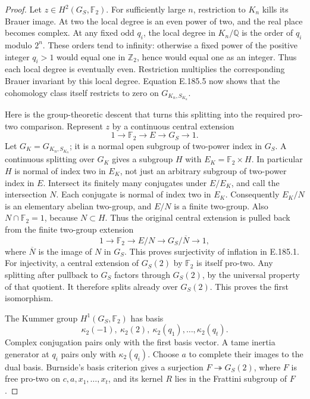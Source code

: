 \begin{proof}
Let \(z\in H^2(G_S,\mathbb F_2)\). For sufficiently large
\(n\), restriction to \(K_n\) kills its Brauer image. At two
the local degree is an even power of two, and the real place
becomes complex. At any fixed odd \(q_i\), the local degree
in \(K_n/\mathbb Q\) is the order of \(q_i\) modulo
\(2^n\). These orders tend to infinity: otherwise a fixed
power of the positive integer \(q_i>1\) would equal one in
\(\mathbb Z_2\), hence would equal one as an integer. Thus
each local degree is eventually even. Restriction multiplies
the corresponding Brauer invariant by this local degree.
Equation E.185.5 now shows that the cohomology class itself
restricts to zero on \(G_{K_n,S_{K_n}}\).

Here is the group-theoretic descent that turns this splitting
into the required pro-two comparison. Represent \(z\) by a
continuous central extension
\[
              1\longrightarrow\mathbb F_2
                \longrightarrow E\longrightarrow G_S
                \longrightarrow1.
\]
Let \(G_K=G_{K_n,S_{K_n}}\); it is a normal open subgroup
of two-power index in \(G_S\). A continuous splitting over
\(G_K\) gives a subgroup \(H\) with
\(E_K=\mathbb F_2\times H\). In particular \(H\) is
normal of index two in \(E_K\), not just an arbitrary
subgroup of two-power index in \(E\). Intersect its finitely
many conjugates under \(E/E_K\), and call the intersection
\(N\). Each conjugate is normal of index two in \(E_K\).
Consequently \(E_K/N\) is an elementary abelian two-group,
and \(E/N\) is a finite two-group. Also
\(N\cap\mathbb F_2=1\), because \(N\subset H\).
Thus the original central extension is pulled back from
the finite two-group extension
\[
       1\longrightarrow\mathbb F_2\longrightarrow E/N
           \longrightarrow G_S/\overline N\longrightarrow1,
\]
where \(\overline N\) is the image of \(N\) in \(G_S\).
This proves surjectivity of inflation in E.185.1.
For injectivity, a central extension of \(G_S(2)\) by
\(\mathbb F_2\) is itself pro-two. Any splitting after
pullback to \(G_S\) factors through \(G_S(2)\), by the
universal property of that quotient. It therefore splits
already over \(G_S(2)\). This proves the first isomorphism.

The Kummer group \(H^1(G_S,\mathbb F_2)\) has basis
\[
             \kappa_2(-1),\ \kappa_2(2),\
                     \kappa_2(q_1),\ldots,\kappa_2(q_t).
 \tag{E.185.6}
\]
Complex conjugation pairs only with the first basis vector.
A tame inertia generator at \(q_i\) pairs only with
\(\kappa_2(q_i)\). Choose \(a\) to complete their images
to the dual basis. Burnside's basis criterion gives a
surjection \(F\twoheadrightarrow G_S(2)\), where \(F\)
is free pro-two on \(c,a,x_1,\ldots,x_t\), and its kernel
\(R\) lies in the Frattini subgroup of \(F\).


\end{proof}
